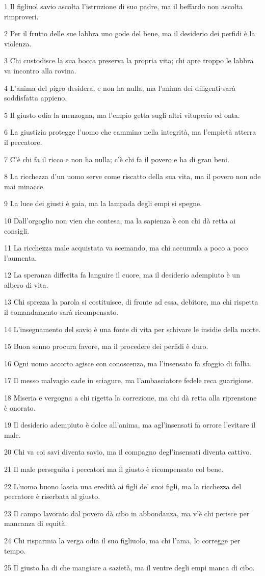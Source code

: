 \par 1 Il figliuol savio ascolta l'istruzione di suo padre, ma il beffardo non ascolta rimproveri.
\par 2 Per il frutto delle sue labbra uno gode del bene, ma il desiderio dei perfidi è la violenza.
\par 3 Chi custodisce la sua bocca preserva la propria vita; chi apre troppo le labbra va incontro alla rovina.
\par 4 L'anima del pigro desidera, e non ha nulla, ma l'anima dei diligenti sarà soddisfatta appieno.
\par 5 Il giusto odia la menzogna, ma l'empio getta sugli altri vituperio ed onta.
\par 6 La giustizia protegge l'uomo che cammina nella integrità, ma l'empietà atterra il peccatore.
\par 7 C'è chi fa il ricco e non ha nulla; c'è chi fa il povero e ha di gran beni.
\par 8 La ricchezza d'un uomo serve come riscatto della sua vita, ma il povero non ode mai minacce.
\par 9 La luce dei giusti è gaia, ma la lampada degli empi si spegne.
\par 10 Dall'orgoglio non vien che contesa, ma la sapienza è con chi dà retta ai consigli.
\par 11 La ricchezza male acquistata va scemando, ma chi accumula a poco a poco l'aumenta.
\par 12 La speranza differita fa languire il cuore, ma il desiderio adempiuto è un albero di vita.
\par 13 Chi sprezza la parola si costituisce, di fronte ad essa, debitore, ma chi rispetta il comandamento sarà ricompensato.
\par 14 L'insegnamento del savio è una fonte di vita per schivare le insidie della morte.
\par 15 Buon senno procura favore, ma il procedere dei perfidi è duro.
\par 16 Ogni uomo accorto agisce con conoscenza, ma l'insensato fa sfoggio di follia.
\par 17 Il messo malvagio cade in sciagure, ma l'ambasciatore fedele reca guarigione.
\par 18 Miseria e vergogna a chi rigetta la correzione, ma chi dà retta alla riprensione è onorato.
\par 19 Il desiderio adempiuto è dolce all'anima, ma agl'insensati fa orrore l'evitare il male.
\par 20 Chi va coi savi diventa savio, ma il compagno degl'insensati diventa cattivo.
\par 21 Il male perseguita i peccatori ma il giusto è ricompensato col bene.
\par 22 L'uomo buono lascia una eredità ai figli de' suoi figli, ma la ricchezza del peccatore è riserbata al giusto.
\par 23 Il campo lavorato dal povero dà cibo in abbondanza, ma v'è chi perisce per mancanza di equità.
\par 24 Chi risparmia la verga odia il suo figliuolo, ma chi l'ama, lo corregge per tempo.
\par 25 Il giusto ha di che mangiare a sazietà, ma il ventre degli empi manca di cibo.

